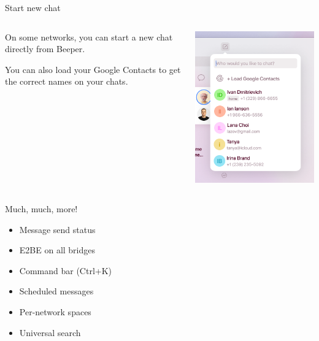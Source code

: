 \documentclass{beeper}
\begin{document}
\begin{frame}{Start new chat}
    \begin{columns}
        \begin{column}{0.6\textwidth}
            On some networks, you can start a new chat directly from Beeper.
            \vspace{1cm}

            You can also load your Google Contacts to get the correct names on
            your chats.
        \end{column}
        \begin{column}{0.4\textwidth}
            \centerline{\includegraphics[width=\textwidth]{images/start-new-chat}}
        \end{column}
    \end{columns}
\end{frame}

\begin{frame}{Much, much, more!}
    \begin{multicols}{2}
        \begin{itemize}
            \item Message send status
            \item E2BE on all bridges
            \item Command bar (Ctrl+K)
            \item Scheduled messages
            \item Per-network spaces
            \item Universal search
        \end{itemize}
    \end{multicols}
\end{frame}
\end{document}
